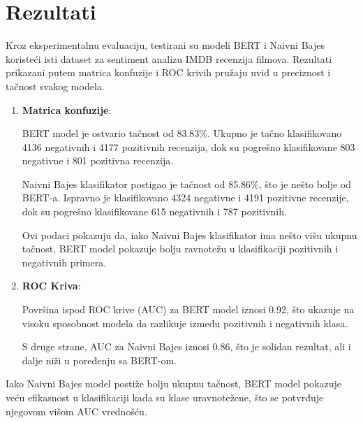 \documentclass{article}
\begin{document}
\section{Rezultati}
Kroz eksperimentalnu evaluaciju, testirani su modeli BERT i Naivni Bajes koristeći isti dataset za sentiment analizu IMDB recenzija filmova. Rezultati prikazani putem matrica konfuzije i ROC krivih pružaju uvid u preciznost i tačnost svakog modela.
 \begin{enumerate}
     \item \textbf{Matrica konfuzije}:

BERT model je ostvario tačnost od 83.83\%. Ukupno je tačno klasifikovano 4136 negativnih i 4177 pozitivnih recenzija, dok su pogrešno klasifikovane 803 negativne i 801 pozitivna recenzija.
    
Naivni Bajes klasifikator postigao je tačnost od 85.86\%, što je nešto bolje od BERT-a. Ispravno je klasifikovano 4324 negativne i 4191 pozitivne recenzije, dok su pogrešno klasifikovane 615 negativnih i 787 pozitivnih.

 
Ovi podaci pokazuju da, iako Naivni Bajes klasifikator ima nešto višu ukupnu tačnost, BERT model pokazuje bolju ravnotežu u klasifikaciji pozitivnih i negativnih primera.

\item \textbf{ROC Kriva}:

Površina ispod ROC krive (AUC) za BERT model iznosi 0.92, što ukazuje na visoku sposobnost modela da razlikuje između pozitivnih i negativnih klasa.

S druge strane, AUC za Naivni Bajes iznosi 0.86, što je solidan rezultat, ali i dalje niži u poređenju sa BERT-om.
\end{enumerate}


Iako Naivni Bajes model postiže bolju ukupnu tačnost, BERT model pokazuje veću efikasnost u klasifikaciji kada su klase uravnotežene, što se potvrđuje njegovom višom AUC vrednošću.
\end{document}
